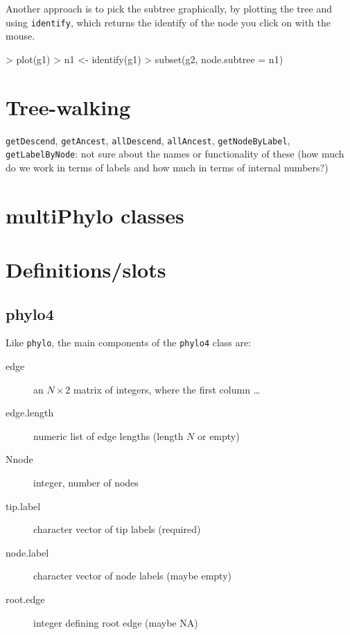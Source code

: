 \documentclass{article}
\newcommand{\code}[1]{{{\tt #1}}}
\begin{document}
Another approach is to pick the subtree graphically, by plotting the tree and using \code{identify}, which returns the identify of the node you click on with the mouse.

\begin{Schunk}
\begin{Sinput}
> plot(g1)
> n1 <- identify(g1)
> subset(g2, node.subtree = n1)
\end{Sinput}
\end{Schunk}

\section{Tree-walking}

\code{getDescend}, \code{getAncest},
\code{allDescend}, \code{allAncest},
\code{getNodeByLabel}, \code{getLabelByNode}:
not sure about the names or functionality of these (how much do we work in terms of labels and how much in terms of internal numbers?)

\section{multiPhylo classes}



\appendix
\section{Definitions/slots}

\subsection{phylo4}
Like \code{phylo}, the main components of
the \code{phylo4} class are:
\begin{description}
\item[edge]{an $N \times 2$ matrix of integers,
  where the first column \ldots}
\item[edge.length]{numeric list of edge lengths
(length $N$ or empty)}
\item[Nnode]{integer, number of nodes}
\item[tip.label]{character vector of tip labels (required)}
\item[node.label]{character vector of node labels (maybe empty)}
\item[root.edge]{integer defining root edge (maybe NA)}
\end{description}
\end{document}

